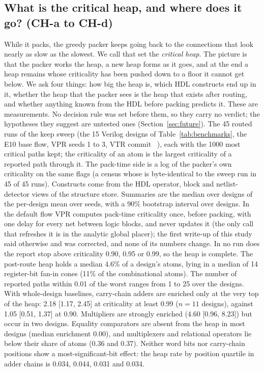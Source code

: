 \subsection{What is the critical heap, and where does it go? (CH-a to CH-d)}
\label{sec:e-heap}

 While it packs, the greedy packer keeps going back to the connections that look nearly as slow as the slowest. We call that set the \emph{critical heap}. The picture is that the packer works the heap, a new heap forms as it goes, and at the end a heap remains whose criticality has been pushed down to a floor it cannot get below. We ask four things: how big the heap is, which HDL constructs end up in it, whether the heap that the packer sees is the heap that exists after routing, and whether anything known from the HDL before packing predicts it. These are measurements. No decision rule was set before them, so they carry no verdict; the hypotheses they suggest are untested ones (Section~\ref{sec:future}).
 The 45 routed runs of the keep sweep (the 15 Verilog designs of Table~\ref{tab:benchmarks}, the E10 base flow, VPR seeds 1 to 3, VTR commit ~\cite{rose2012vtr,elgammal2025vtr9}), each with the 1000 most critical paths kept; the criticality of an atom is the largest criticality of a reported path through it. The pack-time side is a log of the packer's own criticality on the same flags (a census whose  is byte-identical to the sweep run in 45 of 45 runs). Constructs come from the HDL operator, block and netlist-detector views of the structure store. Summaries are the median over designs of the per-design mean over seeds, with a 90\% bootstrap interval over designs. In the default flow VPR computes pack-time criticality once, before packing, with one delay for every net between logic blocks, and never updates it (the only call that refreshes it is in the analytic global placer); the first write-up of this study said otherwise and was corrected, and none of its numbers change.
 In no run does the report stop above criticality 0.90, 0.95 or 0.99, so the heap is complete. The post-route heap holds a median 4.6\% of a design's atoms, lying in a median of 14 register-bit fan-in cones (11\% of the combinational atoms). The number of reported paths within 0.01 of the worst ranges from 1 to 25 over the designs.
 With whole-design baselines, carry-chain adders are enriched only at the very top of the heap: 2.18 [1.17, 2.45] at criticality at least 0.99 ($n=11$ designs), against 1.05 [0.51, 1.37] at 0.90. Multipliers are strongly enriched (4.60 [0.96, 8.23]) but occur in two designs. Equality comparators are absent from the heap in most designs (median enrichment 0.00), and multiplexers and relational operators lie below their share of atoms (0.36 and 0.37). Neither word bits nor carry-chain positions show a most-significant-bit effect: the heap rate by position quartile in adder chains is 0.034, 0.044, 0.031 and 0.034.
